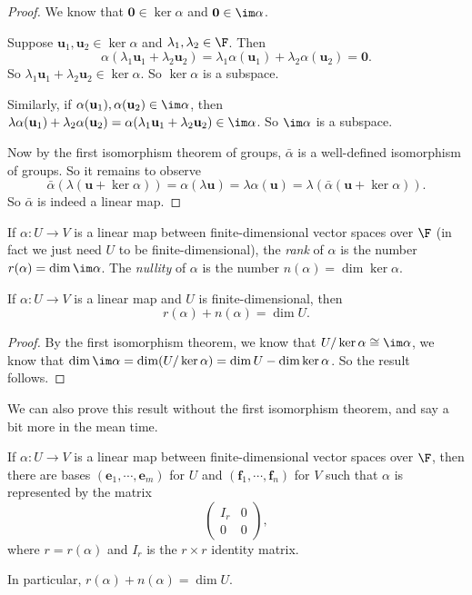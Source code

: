 \documentclass[a4paper]{article}
\begin{document}
\begin{proof}
  We know that $\mathbf{0} \in \ker \alpha$ and $\mathbf{0}\in \im \alpha$.

  Suppose $\mathbf{u}_1, \mathbf{u}_2 \in \ker \alpha$ and $\lambda_1, \lambda_2\in \F$. Then
  \[
    \alpha (\lambda_1 \mathbf{u}_1 + \lambda_2 \mathbf{u}_2) = \lambda_1 \alpha(\mathbf{u}_1) + \lambda_2 \alpha(\mathbf{u}_2)  = \mathbf{0}.
  \]
  So $\lambda_1 \mathbf{u}_1 + \lambda_2 \mathbf{u}_2 \in \ker \alpha$. So $\ker \alpha$ is a subspace.

  Similarly, if $\alpha(\mathbf{u}_1), \alpha(\mathbf{u}_2) \in \im \alpha$, then $\lambda\alpha(\mathbf{u}_1) + \lambda_2 \alpha(\mathbf{u}_2) = \alpha(\lambda_1 \mathbf{u}_1 + \lambda_2 \mathbf{u}_2) \in \im \alpha$. So $\im \alpha$ is a subspace.

  Now by the first isomorphism theorem of groups, $\bar{\alpha}$ is a well-defined isomorphism of groups. So it remains to observe
  \[
    \bar{\alpha}(\lambda(\mathbf{u} + \ker \alpha)) = \alpha (\lambda \mathbf{u}) = \lambda \alpha(\mathbf{u}) = \lambda (\bar{\alpha}(\mathbf{u} + \ker \alpha)).
  \]
  So $\bar {\alpha}$ is indeed a linear map.
\end{proof}

\begin{defi}
  If $\alpha: U\to V$ is a linear map between finite-dimensional vector spaces over $\F$ (in fact we just need $U$ to be finite-dimensional), the \emph{rank} of $\alpha$ is the number $r(\alpha) = \dim \im \alpha$. The \emph{nullity} of $\alpha$ is the number $n(\alpha) = \dim \ker \alpha$.
\end{defi}

\begin{cor}
  If $\alpha: U \to V$ is a linear map and $U$ is finite-dimensional, then
  \[
    r(\alpha) + n(\alpha) = \dim U.
  \]
\end{cor}

\begin{proof}
  By the first isomorphism theorem, we know that $U/\ker \alpha \cong \im \alpha$, we know that $\dim \im \alpha = \dim (U/\ker \alpha) = \dim U - \dim \ker \alpha$. So the result follows.
\end{proof}

We can also prove this result without the first isomorphism theorem, and say a bit more in the mean time.
\begin{prop}
  If $\alpha: U\to V$ is a linear map between finite-dimensional vector spaces over $\F$, then there are bases $(\mathbf{e}_1, \cdots, \mathbf{e}_m)$ for $U$ and $(\mathbf{f}_1, \cdots, \mathbf{f}_n)$ for $V$ such that $\alpha$ is represented by the matrix
  \[
    \begin{pmatrix}
      I_r & 0\\
      0 & 0
    \end{pmatrix},
  \]
  where $r = r(\alpha)$ and $I_r$ is the $r\times r$ identity matrix.

  In particular, $r(\alpha) + n(\alpha) = \dim U$.
\end{prop}
\end{document}

